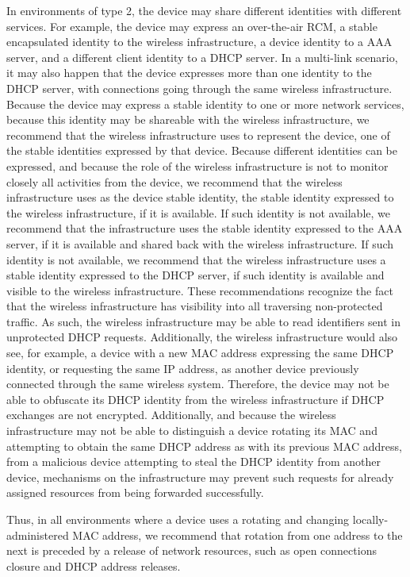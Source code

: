 \documentclass[10pt]{article}
\begin{document}
{In environments of type 2, the device may share different identities with different services. For example, the device may express an over-the-air RCM, a stable encapsulated identity to the wireless infrastructure, a device identity to a AAA server, and a different client identity to a DHCP server. In a multi-link scenario, it may also happen that the device expresses more than one identity to the DHCP server, with connections going through the same wireless infrastructure. Because the device may express a stable identity to one or more network services, because this identity may be shareable with the wireless infrastructure, we recommend that the wireless infrastructure uses to represent the device, one of the stable identities expressed by that device. Because different identities can be expressed, and because the role of the wireless infrastructure is not to monitor closely all activities from the device, we recommend that the wireless infrastructure uses as the device stable identity, the stable identity expressed to the wireless infrastructure, if it is available. If such identity is not available, we recommend that the infrastructure uses the stable identity expressed to the AAA server, if it is available and shared back with the wireless infrastructure. If such identity is not available, we recommend that the wireless infrastructure uses a stable identity expressed to the DHCP server, if such identity is available and visible to the wireless infrastructure. These recommendations recognize the fact that the wireless infrastructure has visibility into all traversing non-protected traffic. As such, the wireless infrastructure may be able to read identifiers sent in unprotected DHCP requests. Additionally, the wireless infrastructure would also see, for example, a device with a new MAC address expressing the same DHCP identity, or requesting the same IP address, as another device previously connected through the same wireless system. Therefore, the device may not be able to obfuscate its DHCP identity from the wireless infrastructure if DHCP exchanges are not encrypted. Additionally, and because the wireless infrastructure may not be able to distinguish a device rotating its MAC and attempting to obtain the same DHCP address as with its previous MAC address, from a malicious device attempting to steal the DHCP identity from another device, mechanisms on the infrastructure may prevent such requests for already assigned resources from being forwarded successfully.

Thus, in all environments where a device uses a rotating and changing locally-administered MAC address, we recommend that rotation from one address to the next is preceded by a release of network resources, such as open connections closure and DHCP address releases.


}
\end{document}
